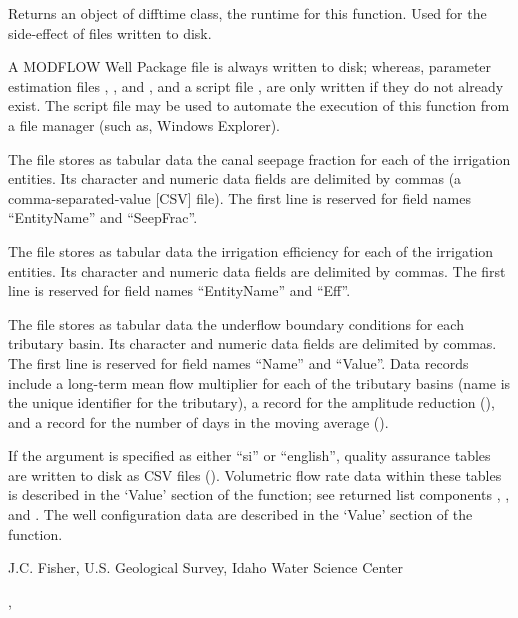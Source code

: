 \documentclass[a4paper]{book}
\begin{document}
%
\begin{Value}
Returns an object of difftime class, the runtime for this function.
Used for the side-effect of files written to disk.

A MODFLOW Well Package file  is always written to disk; whereas,
parameter estimation files , , and , and
a script file , are only written if they do not already exist.
The script file may be used to automate the execution of this function from a
file manager (such as, Windows Explorer).

The  file stores as tabular data the canal seepage fraction for
each of the irrigation entities.
Its character and numeric data fields are delimited by commas (a comma-separated-value [CSV] file).
The first line is reserved for field names ``EntityName'' and ``SeepFrac''.

The  file stores as tabular data the irrigation efficiency for
each of the irrigation entities.
Its character and numeric data fields are delimited by commas.
The first line is reserved for field names ``EntityName'' and ``Eff''.

The  file stores as tabular data the underflow boundary conditions for
each tributary basin.
Its character and numeric data fields are delimited by commas.
The first line is reserved for field names ``Name'' and ``Value''.
Data records include a long-term mean flow multiplier for
each of the tributary basins (name is the unique identifier for the tributary),
a record for the amplitude reduction (), and
a record for the number of days in the moving average ().

If the  argument is specified as either ``si'' or ``english'',
quality assurance tables are written to disk as CSV files ().
Volumetric flow rate data within these tables is described in the
`Value' section of the  function;
see returned list components , , and .
The well configuration data are described in the `Value' section of the
 function.
\end{Value}
%
\begin{Author}\relax
J.C. Fisher, U.S. Geological Survey, Idaho Water Science Center
\end{Author}
%
\begin{SeeAlso}\relax
{}, 
\end{SeeAlso}
\end{document}
